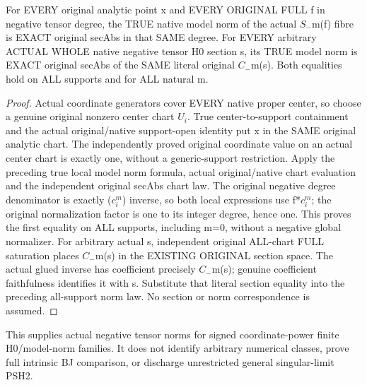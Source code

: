 \begin{theorem}
\label{thm:seven-native-negative-tensor-full-model-norm-dictionary}
\leanok
For EVERY original analytic point x and EVERY ORIGINAL FULL f in
negative tensor degree, the TRUE native model norm of the actual
$S_-$m(f) fibre is EXACT original secAbs in that SAME degree. For EVERY
arbitrary ACTUAL WHOLE native negative tensor H0 section s, its TRUE
model norm is EXACT original secAbs of the SAME literal original
$C_-$m(s). Both equalities hold on ALL supports and for ALL natural m.
\end{theorem}
\begin{proof}
Actual coordinate generators cover EVERY native proper center, so
choose a genuine original nonzero center chart $U_i$. True center-to-support
containment and the actual original/native support-open identity put
x in the SAME original analytic chart. The independently proved
original coordinate value on an actual center chart is exactly one,
without a generic-support restriction. Apply the preceding true local
model norm formula, actual original/native chart evaluation and the
independent original secAbs chart law. The original negative degree
denominator is exactly ($c_i^m$) inverse, so both local expressions use
f*$c_i^m$; the original normalization factor is one to its integer degree,
hence one. This proves the first equality on ALL supports, including
m=0, without a negative global normalizer.
For arbitrary actual s, independent original ALL-chart FULL saturation
places $C_-$m(s) in the EXISTING ORIGINAL section space. The actual glued
inverse has coefficient precisely $C_-$m(s); genuine coefficient
faithfulness identifies it with s. Substitute that literal section
equality into the preceding all-support norm law. No section or norm
correspondence is assumed.
\end{proof}

This supplies actual negative tensor norms for signed coordinate-power
finite H0/model-norm families. It does not identify arbitrary numerical
classes, prove full intrinsic BJ comparison, or discharge unrestricted
general singular-limit PSH2.

